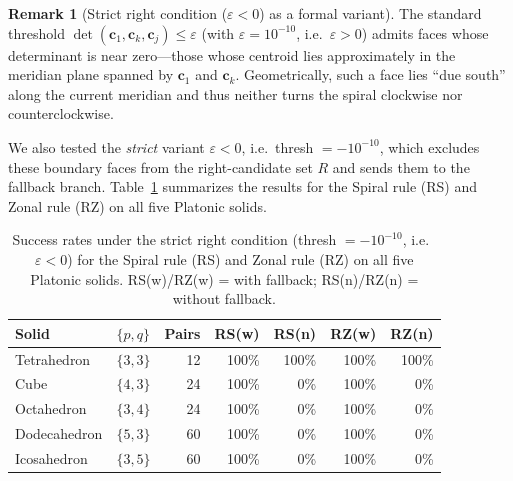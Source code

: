 \documentclass[12pt]{article}
\theoremstyle{definition}
\newtheorem{remark}{Remark}[section]
\begin{document}
\begin{remark}[Strict right condition ($\varepsilon<0$) as a formal variant]
\label{rem:strict-eps}
The standard threshold $\det(\mathbf{c}_1,\mathbf{c}_k,\mathbf{c}_j)\le \varepsilon$
(with $\varepsilon=10^{-10}$, i.e.\ $\varepsilon>0$) admits faces whose
determinant is near zero---those whose centroid lies approximately in the
meridian plane spanned by $\mathbf{c}_1$ and $\mathbf{c}_k$.
Geometrically, such a face lies ``due south'' along the current meridian
and thus neither turns the spiral clockwise nor counterclockwise.

We also tested the \emph{strict} variant $\varepsilon<0$, i.e.\
thresh $= -10^{-10}$, which excludes these boundary faces from
the right-candidate set $R$ and sends them to the fallback branch.
Table~\ref{tab:strict} summarizes the results for the Spiral rule (RS)
and Zonal rule (RZ) on all five Platonic solids.

\begin{table}[ht]
\centering
\caption{Success rates under the strict right condition
  (thresh $=-10^{-10}$, i.e.\ $\varepsilon<0$) for the Spiral rule (RS)
  and Zonal rule (RZ) on all five Platonic solids.
  RS(w)/RZ(w) = with fallback; RS(n)/RZ(n) = without fallback.}
\label{tab:strict}
\renewcommand{\arraystretch}{1.1}
\begin{tabular}{llrrrrr}
\toprule
Solid & $\{p,q\}$ & Pairs & RS(w) & RS(n) & RZ(w) & RZ(n) \\
\midrule
Tetrahedron  & $\{3,3\}$ & 12 & 100\% & 100\% & 100\% & 100\% \\
Cube         & $\{4,3\}$ & 24 & 100\% &   0\% & 100\% &   0\% \\
Octahedron   & $\{3,4\}$ & 24 & 100\% &   0\% & 100\% &   0\% \\
Dodecahedron & $\{5,3\}$ & 60 & 100\% &   0\% & 100\% &   0\% \\
Icosahedron  & $\{3,5\}$ & 60 & 100\% &   0\% & 100\% &   0\% \\
\bottomrule
\end{tabular}
\end{table}


\end{remark}
\end{document}
